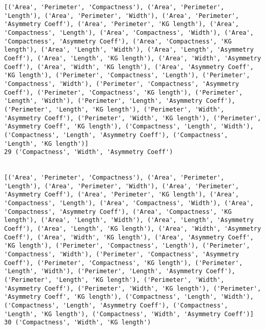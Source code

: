\documentclass[11pt]{article}
\begin{document}
\begin{Verbatim}[commandchars=\\\{\}]
[('Area', 'Perimeter', 'Compactness'), ('Area', 'Perimeter', 'Length'), ('Area', 'Perimeter', 'Width'), ('Area', 'Perimeter', 'Asymmetry Coeff'), ('Area', 'Perimeter', 'KG length'), ('Area', 'Compactness', 'Length'), ('Area', 'Compactness', 'Width'), ('Area', 'Compactness', 'Asymmetry Coeff'), ('Area', 'Compactness', 'KG length'), ('Area', 'Length', 'Width'), ('Area', 'Length', 'Asymmetry Coeff'), ('Area', 'Length', 'KG length'), ('Area', 'Width', 'Asymmetry Coeff'), ('Area', 'Width', 'KG length'), ('Area', 'Asymmetry Coeff', 'KG length'), ('Perimeter', 'Compactness', 'Length'), ('Perimeter', 'Compactness', 'Width'), ('Perimeter', 'Compactness', 'Asymmetry Coeff'), ('Perimeter', 'Compactness', 'KG length'), ('Perimeter', 'Length', 'Width'), ('Perimeter', 'Length', 'Asymmetry Coeff'), ('Perimeter', 'Length', 'KG length'), ('Perimeter', 'Width', 'Asymmetry Coeff'), ('Perimeter', 'Width', 'KG length'), ('Perimeter', 'Asymmetry Coeff', 'KG length'), ('Compactness', 'Length', 'Width'), ('Compactness', 'Length', 'Asymmetry Coeff'), ('Compactness', 'Length', 'KG length')]
29 ('Compactness', 'Width', 'Asymmetry Coeff')


[('Area', 'Perimeter', 'Compactness'), ('Area', 'Perimeter', 'Length'), ('Area', 'Perimeter', 'Width'), ('Area', 'Perimeter', 'Asymmetry Coeff'), ('Area', 'Perimeter', 'KG length'), ('Area', 'Compactness', 'Length'), ('Area', 'Compactness', 'Width'), ('Area', 'Compactness', 'Asymmetry Coeff'), ('Area', 'Compactness', 'KG length'), ('Area', 'Length', 'Width'), ('Area', 'Length', 'Asymmetry Coeff'), ('Area', 'Length', 'KG length'), ('Area', 'Width', 'Asymmetry Coeff'), ('Area', 'Width', 'KG length'), ('Area', 'Asymmetry Coeff', 'KG length'), ('Perimeter', 'Compactness', 'Length'), ('Perimeter', 'Compactness', 'Width'), ('Perimeter', 'Compactness', 'Asymmetry Coeff'), ('Perimeter', 'Compactness', 'KG length'), ('Perimeter', 'Length', 'Width'), ('Perimeter', 'Length', 'Asymmetry Coeff'), ('Perimeter', 'Length', 'KG length'), ('Perimeter', 'Width', 'Asymmetry Coeff'), ('Perimeter', 'Width', 'KG length'), ('Perimeter', 'Asymmetry Coeff', 'KG length'), ('Compactness', 'Length', 'Width'), ('Compactness', 'Length', 'Asymmetry Coeff'), ('Compactness', 'Length', 'KG length'), ('Compactness', 'Width', 'Asymmetry Coeff')]
30 ('Compactness', 'Width', 'KG length')



\end{Verbatim}
\end{document}
